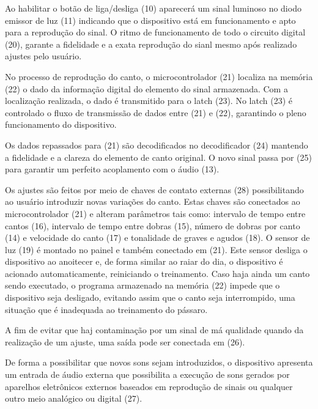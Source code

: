 \documentclass[12pt]{article}
\begin{document}
Ao habilitar o botão de liga/desliga (10) aparecerá um sinal luminoso
no diodo emissor de luz (11) indicando que o dispositivo está em
funcionamento e apto para a reprodução do sinal. O ritmo de
funcionamento de todo o circuito digital (20), garante a fidelidade e
a exata reprodução do sianl mesmo após realizado ajustes pelo usuário.

No processo de reprodução do canto, o microcontrolador (21) localiza
na memória (22) o dado da informação digital do elemento do sinal
armazenada. Com a localização realizada, o dado é transmitido para o
latch (23).  No latch (23) é controlado o fluxo de transmissão de
dados entre (21) e (22), garantindo o pleno funcionamento do
dispositivo.

Os dados repassados para (21) são decodificados no decodificador (24)
mantendo a fidelidade e a clareza do elemento de canto original. O
novo sinal passa por (25) para garantir um perfeito acoplamento com o
áudio (13).

Os ajustes são feitos por meio de chaves de contato externas (28)
possibilitando ao usuário introduzir novas variações do canto. Estas
chaves são conectados ao microcontrolador (21) e alteram parâmetros
tais como: intervalo de tempo entre cantos (16), intervalo de tempo
entre dobras (15), número de dobras por canto (14) e velocidade do
canto (17) e tonalidade de graves e agudos (18).  O sensor de luz (19)
é montado no painel e também conectado em (21). Este sensor desliga o
dispositivo ao anoitecer e, de forma similar ao raiar do dia, o
dispositivo é acionado automaticamente, reiniciando o treinamento.
Caso haja ainda um canto sendo executado, o programa armazenado na
memória (22) impede que o dispositivo seja desligado, evitando assim
que o canto seja interrompido, uma situação que é inadequada ao
treinamento do pássaro.

A fim de evitar que haj contaminação por um sinal de má qualidade
quando da realização de um ajuste, uma saída pode ser conectada em
(26).

De forma a possibilitar que novos sons sejam introduzidos, o
dispositivo apresenta um entrada de áudio externa que possibilita a
execução de sons gerados por aparelhos eletrônicos externos baseados
em reprodução de sinais ou qualquer outro meio analógico ou digital
(27).

 \label{fimdescr}


\newpage

\noitemsep
\end{document}
